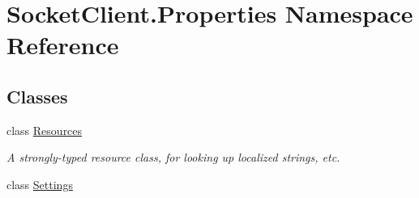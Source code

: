 \hypertarget{namespace_socket_client_1_1_properties}{}\section{Socket\+Client.\+Properties Namespace Reference}
\label{namespace_socket_client_1_1_properties}
\subsection*{Classes}
\begin{DoxyCompactItemize}
\item 
class \hyperlink{class_socket_client_1_1_properties_1_1_resources}{Resources}
\begin{DoxyCompactList}\small\item\em A strongly-\/typed resource class, for looking up localized strings, etc. \end{DoxyCompactList}\item 
class \hyperlink{class_socket_client_1_1_properties_1_1_settings}{Settings}
\end{DoxyCompactItemize}
